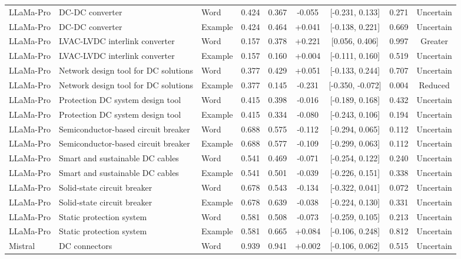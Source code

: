 \begin{landscape}
\begin{longtable}{lllcccccc}
LLaMa-Pro & DC-DC converter & Word & 0.424 & 0.367 & -0.055 & [-0.231, 0.133] & 0.271 & Uncertain \\
LLaMa-Pro & DC-DC converter & Example & 0.424 & 0.464 & +0.041 & [-0.138, 0.221] & 0.669 & Uncertain \\
LLaMa-Pro & LVAC-LVDC interlink converter & Word & 0.157 & 0.378 & +0.221 & [0.056, 0.406] & 0.997 & Greater \\
LLaMa-Pro & LVAC-LVDC interlink converter & Example & 0.157 & 0.160 & +0.004 & [-0.111, 0.160] & 0.519 & Uncertain \\
LLaMa-Pro & Network design tool for DC solutions & Word & 0.377 & 0.429 & +0.051 & [-0.133, 0.244] & 0.707 & Uncertain \\
LLaMa-Pro & Network design tool for DC solutions & Example & 0.377 & 0.145 & -0.231 & [-0.350, -0.072] & 0.004 & Reduced \\
LLaMa-Pro & Protection DC system design tool & Word & 0.415 & 0.398 & -0.016 & [-0.189, 0.168] & 0.432 & Uncertain \\
LLaMa-Pro & Protection DC system design tool & Example & 0.415 & 0.334 & -0.080 & [-0.243, 0.106] & 0.194 & Uncertain \\
LLaMa-Pro & Semiconductor-based circuit breaker & Word & 0.688 & 0.575 & -0.112 & [-0.294, 0.065] & 0.112 & Uncertain \\
LLaMa-Pro & Semiconductor-based circuit breaker & Example & 0.688 & 0.577 & -0.109 & [-0.299, 0.063] & 0.112 & Uncertain \\
LLaMa-Pro & Smart and sustainable DC cables & Word & 0.541 & 0.469 & -0.071 & [-0.254, 0.122] & 0.240 & Uncertain \\
LLaMa-Pro & Smart and sustainable DC cables & Example & 0.541 & 0.501 & -0.039 & [-0.226, 0.151] & 0.338 & Uncertain \\
LLaMa-Pro & Solid-state circuit breaker & Word & 0.678 & 0.543 & -0.134 & [-0.322, 0.041] & 0.072 & Uncertain \\
LLaMa-Pro & Solid-state circuit breaker & Example & 0.678 & 0.639 & -0.038 & [-0.224, 0.130] & 0.331 & Uncertain \\
LLaMa-Pro & Static protection system & Word & 0.581 & 0.508 & -0.073 & [-0.259, 0.105] & 0.213 & Uncertain \\
LLaMa-Pro & Static protection system & Example & 0.581 & 0.665 & +0.084 & [-0.106, 0.248] & 0.812 & Uncertain \\
Mistral & DC connectors & Word & 0.939 & 0.941 & +0.002 & [-0.106, 0.062] & 0.515 & Uncertain \\

\end{longtable}
\end{landscape}
